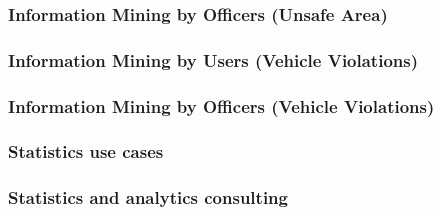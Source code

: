 \subsubsection{Information Mining by Officers (Unsafe Area)}

\newpage
{}
\subsubsection{Information Mining by Users (Vehicle Violations)}

\newpage
\subsubsection{Information Mining by Officers (Vehicle Violations)}

\newpage

\subsubsection{Statistics use cases}
\subsubsection{Statistics and analytics consulting}

\newpage

\newpage

